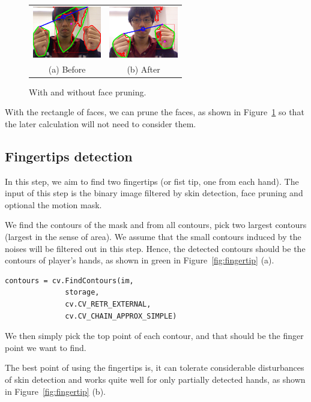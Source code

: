 \documentclass[10pt,twocolumn,letterpaper]{article}
\begin{document}
 \begin{figure}[h]
 \centering
 \begin{tabular}{cc}
 \includegraphics[width=3cm]{without_prune_face.png} &
 \includegraphics[width=3cm]{after_face_prune.png} \\
 (a) Before &
 (b) After
 \end{tabular}
 \caption{With and without face pruning.}
 \label{fig:faceprune}
 \end{figure}

With the rectangle of faces, we can prune the faces, 
as shown in Figure~\ref{fig:faceprune} so that 
the later calculation will not need to consider them.


\subsection{Fingertips detection}
In this step, we aim to find two fingertips (or fist tip, 
one from each hand). The input of this step is the binary image 
filtered by skin detection, face pruning and optional the motion mask.

We find the contours of the mask and from all contours, pick 
two largest contours (largest in the sense of area). 
We assume that the small contours induced by the noises will be 
filtered out in this step. Hence, the detected contours should 
be the contours of player's hands, as shown in green in Figure~\ref{fig:fingertip} (a).

\begin{verbatim}
contours = cv.FindContours(im,
              storage,
              cv.CV_RETR_EXTERNAL,
              cv.CV_CHAIN_APPROX_SIMPLE)
\end{verbatim}

We then simply pick the top point of each contour, and that 
should be the finger point we want to find.

The best point of using the fingertips is, it can tolerate 
considerable disturbances of skin detection and works quite 
well for only partially detected hands, as shown in Figure~\ref{fig:fingertip} (b).
\end{document}
